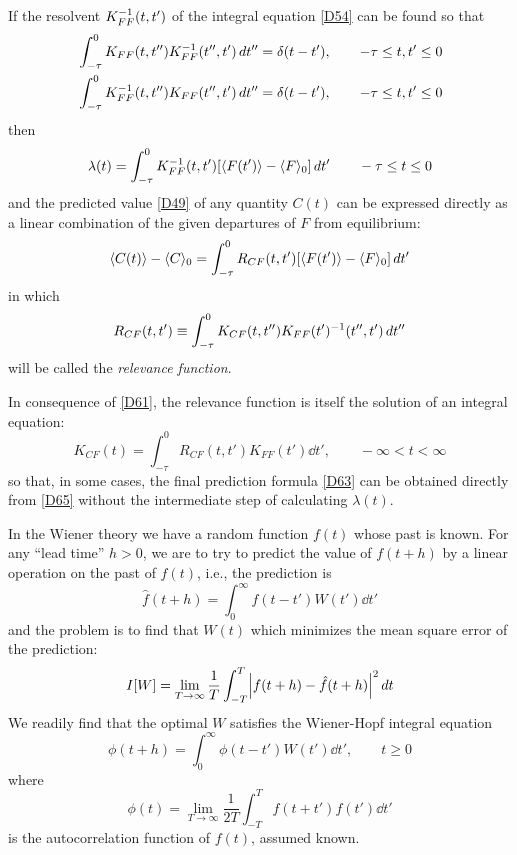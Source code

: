 If the resolvent $K_{FF}^{-1}(t, t')$ of the integral equation \eqref{D54} can be found so that
\begin{align}
	&\int_{-\tau}^{0} K_{FF}(t, t'')  K_{FF}^{-1} (t'', t') \mathop{}\!d t'' = \delta(t - t'), \qquad -\tau \leq t, t' \leq 0\\
	&\int_{-\tau}^{0} K_{FF}^{-1}(t, t'')  K_{FF}(t'', t') \mathop{}\!d t'' = \delta(t - t'), \qquad -\tau \leq t, t' \leq 0\label{D61}
\end{align}
then
\begin{equation}
	\lambda(t) = \int_{-\tau}^{0} K_{FF}^{-1}(t, t')  [\langle F(t')\rangle - \langle F\rangle_0] \mathop{}\!d t' \qquad -\tau \leq t \leq 0
\end{equation}
and the predicted value \eqref{D49} of any quantity $C(t)$ can be expressed directly as a linear combination of the given departures of $F$ from equilibrium:
\begin{equation}
	\label{D63}
	\langle C(t)\rangle - \langle C\rangle_0 = \int_{-\tau}^{0} R_{CF}(t, t') [\langle F(t')\rangle - \langle F\rangle_0] \mathop{}\!d t'
\end{equation}
in which
\begin{equation}
	R_{CF}(t, t') \equiv \int_{-\tau}^{0} K_{CF}(t, t'') K_{FF}(t')^{-1}(t'', t') \mathop{}\!d t''
\end{equation}
will be called the \emph{relevance function}.

In consequence of \eqref{D61}, the relevance function is itself the solution of an integral equation:
\begin{equation}
	\label{D65}
	K_{CF}(t) = \int_{-\tau}^{0} R_{CF}(t, t') K_{FF}(t') \dd t', \qquad -\infty < t < \infty
\end{equation}
so that, in some cases, the final prediction formula \eqref{D63} can be obtained directly from \eqref{D65} without the intermediate step of calculating $\lambda(t)$.

In the Wiener theory we have a random function $f(t)$ whose past is known.
For any ``lead time'' $h > 0$, we are to try to predict the value of $f(t + h)$ by a linear operation on the past of $f(t)$, i.e., the prediction is
\begin{equation}
	\hat{f}(t + h) = \int_{0}^{\infty} f(t - t') W(t') \dd t'
\end{equation}
and the problem is to find that $W(t)$ which minimizes the mean square error of the prediction:
\begin{equation}
	I[W] = \lim_{T \to \infty} \frac{1}{T} \int_{-T}^{T} \abs*{f(t+h) - \hat{f}(t + h)}^2 \dd t
\end{equation}
We readily find that the optimal $W$ satisfies the Wiener-Hopf integral equation
\begin{equation}
	\label{D68}
	\phi(t + h) = \int_{0}^{\infty} \phi(t - t') W(t') \dd t', \qquad t \geq 0
\end{equation}
where
\begin{equation}
	\label{D69}
	\phi(t) = \lim_{T \to \infty} \frac{1}{2T} \int_{-T}^{T} f(t + t') f(t') \dd t'
\end{equation}
is the autocorrelation function of $f(t)$, assumed known.

